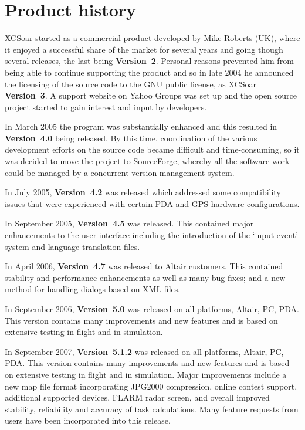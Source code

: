 \documentclass[a4paper,12pt]{refrep}
\begin{document}
\section{Product history}

XCSoar started as a commercial product developed by Mike Roberts (UK),
where it enjoyed a successful share of the market for several years
and going though several releases, the last being {\bf Version~2}.
Personal reasons prevented him from being able to continue supporting
the product and so in late 2004 he announced the licensing of the
source code to the GNU public license, as XCSoar {\bf Version~3}.  A support
website on Yahoo Groups was set up and the open source project started
to gain interest and input by developers.

In March 2005 the program was substantially enhanced and this resulted 
in {\bf Version~4.0} being released.  By this time, coordination of
the various development efforts on the source code became difficult
and time-consuming, so it was decided to move the project to
SourceForge, whereby all the software work could be managed by a
concurrent version management system.

In July 2005, {\bf Version~4.2} was released which addressed some
compatibility issues that were experienced with certain PDA and GPS
hardware configurations.

In September 2005, {\bf Version~4.5} was released.  This contained
major enhancements to the user interface including the introduction
of the `input event' system and language translation files.

In April 2006, {\bf Version~4.7} was released to Altair customers.
This contained stability and performance enhancements as well as many
bug fixes; and a new method for handling dialogs based on XML files.

In September 2006, {\bf Version~5.0} was released on all platforms,
Altair, PC, PDA.  This version contains many improvements and new
features and is based on extensive testing in flight and in
simulation.

In September 2007, {\bf Version~5.1.2} was released on all platforms,
Altair, PC, PDA.  This version contains many improvements and new
features and is based on extensive testing in flight and in
simulation.  Major improvements include a new map file format
incorporating JPG2000 compression, online contest support, additional
supported devices, FLARM radar screen, and overall improved stability,
reliability and accuracy of task calculations.  Many feature requests
from users have been incorporated into this release.
\end{document}
